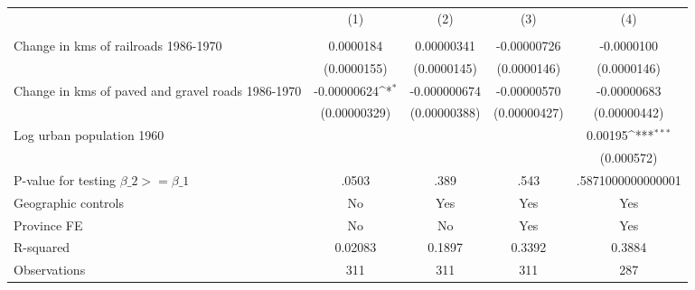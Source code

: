 {
\def\sym#1{\ifmmode^{#1}\else\(^{#1}\)\fi}
\begin{tabular}{l*{4}{c}}
\hline\hline
                &\multicolumn{1}{c}{(1)}&\multicolumn{1}{c}{(2)}&\multicolumn{1}{c}{(3)}&\multicolumn{1}{c}{(4)}\\
                &\multicolumn{1}{c}{}&\multicolumn{1}{c}{}&\multicolumn{1}{c}{}&\multicolumn{1}{c}{}\\
\hline
Change in kms of railroads 1986-1970&0.0000184         &0.00000341         &-0.00000726         &-0.0000100         \\
                &(0.0000155)         &(0.0000145)         &(0.0000146)         &(0.0000146)         \\
[1em]
Change in kms of paved and gravel roads 1986-1970&-0.00000624\sym{*}  &-0.000000674         &-0.00000570         &-0.00000683         \\
                &(0.00000329)         &(0.00000388)         &(0.00000427)         &(0.00000442)         \\
[1em]
Log urban population 1960&                  &                  &                  &  0.00195\sym{***}\\
                &                  &                  &                  &(0.000572)         \\
\hline
P-value for testing $\beta\_{2} >= \beta\_{1}$&    .0503         &     .389         &     .543         &.5871000000000001         \\
Geographic controls&       No         &      Yes         &      Yes         &      Yes         \\
Province FE     &       No         &       No         &      Yes         &      Yes         \\
R-squared       &  0.02083         &   0.1897         &   0.3392         &   0.3884         \\
Observations    &      311         &      311         &      311         &      287         \\
\hline\hline
\end{tabular}
}
